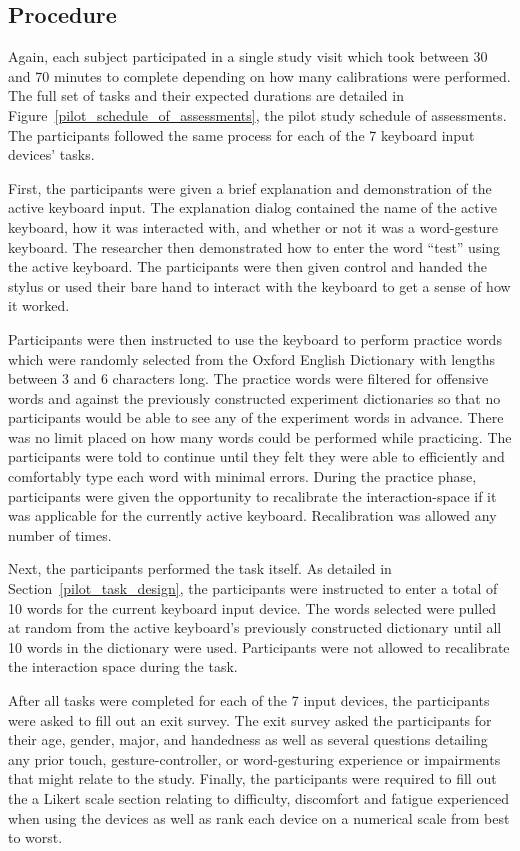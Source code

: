 \subsection{Procedure} \label{pilot_procedure}
Again, each subject participated in a single study visit which took between 30 and 70 minutes to complete depending on how many calibrations were performed. The full set of tasks and their expected durations are detailed in Figure~\ref{pilot_schedule_of_assessments}, the pilot study schedule of assessments. The participants followed the same process for each of the 7 keyboard input devices' tasks.

First, the participants were given a brief explanation and demonstration of the active keyboard input. The explanation dialog contained the name of the active keyboard, how it was interacted with, and whether or not it was a word-gesture keyboard. The researcher then demonstrated how to enter the word ``test'' using the active keyboard. The participants were then given control and handed the stylus or used their bare hand to interact with the keyboard to get a sense of how it worked.

Participants were then instructed to use the keyboard to perform practice words which were randomly selected from the Oxford English Dictionary with lengths between 3 and 6 characters long. The practice words were filtered for offensive words and against the previously constructed experiment dictionaries so that no participants would be able to see any of the experiment words in advance. There was no limit placed on how many words could be performed while practicing. The participants were told to continue until they felt they were able to efficiently and comfortably type each word with minimal errors. During the practice phase, participants were given the opportunity to recalibrate the interaction-space if it was applicable for the currently active keyboard. Recalibration was allowed any number of times.

Next, the participants performed the task itself. As detailed in Section~\ref{pilot_task_design}, the participants were instructed to enter a total of 10 words for the current keyboard input device. The words selected were pulled at random from the active keyboard's previously constructed dictionary until all 10 words in the dictionary were used. Participants were not allowed to recalibrate the interaction space during the task. 

After all tasks were completed for each of the 7 input devices, the participants were asked to fill out an exit survey. The exit survey asked the participants for their age, gender, major, and handedness as well as several questions detailing any prior touch, gesture-controller, or word-gesturing experience or impairments that might relate to the study. Finally, the participants were required to fill out the a Likert scale section relating to difficulty, discomfort and fatigue experienced when using the devices as well as rank each device on a numerical scale from best to worst.
			
